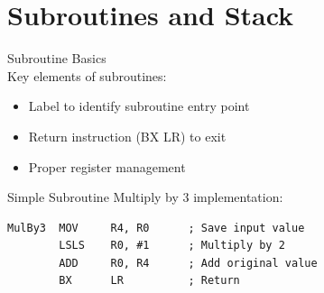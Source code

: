\section{Subroutines and Stack}

\begin{concept}{Subroutine Basics}\\
Key elements of subroutines:
\begin{itemize}
  \item Label to identify subroutine entry point
  \item Return instruction (BX LR) to exit
  \item Proper register management
\end{itemize}
\end{concept}

\begin{example2}{Simple Subroutine}
Multiply by 3 implementation:
\begin{lstlisting}[language=armasm, style=basesmol]
MulBy3  MOV     R4, R0      ; Save input value
        LSLS    R0, #1      ; Multiply by 2
        ADD     R0, R4      ; Add original value
        BX      LR          ; Return
\end{lstlisting}
\end{example2}


